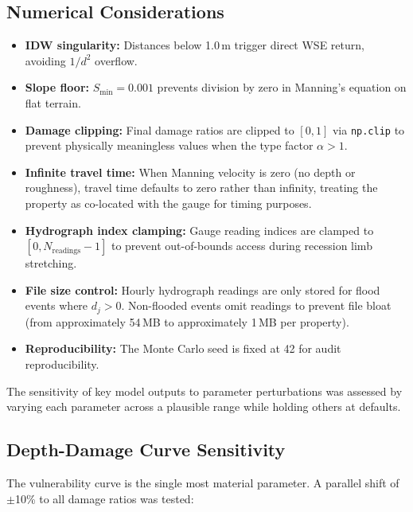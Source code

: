 \documentclass[11pt,a4paper]{article}
\begin{document}
\subsection{Numerical Considerations}

\begin{itemize}[nosep]
    \item \textbf{IDW singularity:} Distances below 1.0\,m trigger direct WSE return,
          avoiding $1/d^2$ overflow.
    \item \textbf{Slope floor:} $S_{\min} = 0.001$ prevents division by zero in
          Manning's equation on flat terrain.
    \item \textbf{Damage clipping:} Final damage ratios are clipped to $[0, 1]$ via
          \texttt{np.clip} to prevent physically meaningless values when the type
          factor $\alpha > 1$.
    \item \textbf{Infinite travel time:} When Manning velocity is zero (no depth or
          roughness), travel time defaults to zero rather than infinity, treating the
          property as co-located with the gauge for timing purposes.
    \item \textbf{Hydrograph index clamping:} Gauge reading indices are clamped to
          $[0, N_{\text{readings}} - 1]$ to prevent out-of-bounds access during
          recession limb stretching.
    \item \textbf{File size control:} Hourly hydrograph readings are only stored for
          flood events where $d_j > 0$. Non-flooded events omit readings to prevent
          file bloat (from approximately 54\,MB to approximately 1\,MB per property).
    \item \textbf{Reproducibility:} The Monte Carlo seed is fixed at 42 for audit
          reproducibility.
\end{itemize}

\mkmsensitivity

The sensitivity of key model outputs to parameter perturbations was assessed by
varying each parameter across a plausible range while holding others at defaults.

\subsection{Depth-Damage Curve Sensitivity}

The vulnerability curve is the single most material parameter. A parallel shift of
$\pm$10\% to all damage ratios was tested:
\end{document}

